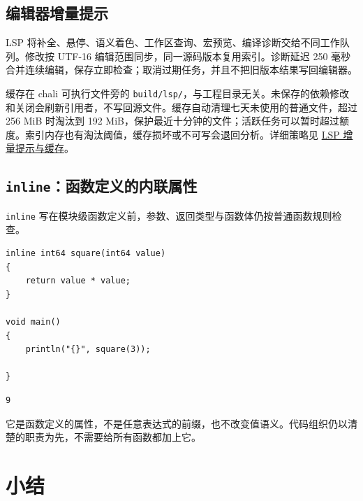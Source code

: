 \subsection*{编辑器增量提示}

LSP 将补全、悬停、语义着色、工作区查询、宏预览、编译诊断交给不同工作队列。修改按 UTF-16 编辑范围同步，同一源码版本复用索引。诊断延迟 250 毫秒合并连续编辑，保存立即检查；取消过期任务，并且不把旧版本结果写回编辑器。

缓存在 chali 可执行文件旁的 \texttt{build/\allowbreak{}lsp/\allowbreak{}}，与工程目录无关。未保存的依赖修改和关闭会刷新引用者，不写回源文件。缓存自动清理七天未使用的普通文件，超过 256 MiB 时淘汰到 192 MiB，保护最近十分钟的文件；活跃任务可以暂时超过额度。索引内存也有淘汰阈值，缓存损坏或不可写会退回分析。详细策略见 \href{https://gitee.com/rabbitc999/chali/blob/master/doc/man/lsp.md}{LSP 增量提示与缓存}。

\subsection*{\texttt{inline}：函数定义的内联属性}

\texttt{inline} 写在模块级函数定义前，参数、返回类型与函数体仍按普通函数规则检查。

\par
\medskip
\begin{lstlisting}[style=chali]
inline int64 square(int64 value)
{
    return value * value;
}

void main()
{
    println("{}", square(3));

}
\end{lstlisting}
\par
\medskip

\par
\medskip
\begin{lstlisting}[style=out]
9
\end{lstlisting}
\par
\medskip

它是函数定义的属性，不是任意表达式的前缀，也不改变值语义。代码组织仍以清楚的职责为先，不需要给所有函数都加上它。

\section{小结}

